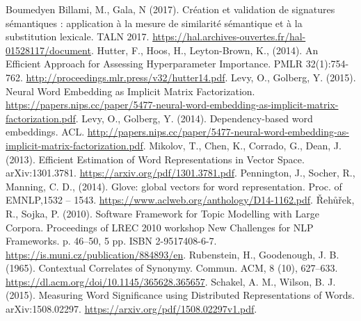 \documentclass[11pt,french,french]{article}
\begin{document}
\newpage

\nocite{*}

\begin{thebibliography}{999}
 Boumedyen Billami, M.,  Gala, N (2017). Création et validation de signatures sémantiques : application à la mesure de similarité sémantique et à la substitution lexicale. TALN 2017. \url{https://hal.archives-ouvertes.fr/hal-01528117/document}.
 Hutter, F., Hoos, H., Leyton-Brown, K., (2014). An Efficient Approach for Assessing Hyperparameter Importance. PMLR 32(1):754-762. \url{http://proceedings.mlr.press/v32/hutter14.pdf}.
 Levy, O., Golberg, Y. (2015). Neural Word Embedding as Implicit Matrix Factorization.
\url{https://papers.nips.cc/paper/5477-neural-word-embedding-as-implicit-matrix-factorization.pdf}.
 Levy, O., Golberg, Y. (2014). Dependency-based word embeddings. ACL. \url{http://papers.nips.cc/paper/5477-neural-word-embedding-as-implicit-matrix-factorization.pdf}.
 Mikolov, T.,  Chen, K., Corrado, G., Dean, J. (2013). Efficient Estimation of Word Representations in Vector Space. arXiv:1301.3781. \url{https://arxiv.org/pdf/1301.3781.pdf}.
 Pennington, J., Socher, R., Manning, C. D., (2014).  Glove: global vectors for word representation. Proc. of EMNLP,1532 – 1543. \url{https://www.aclweb.org/anthology/D14-1162.pdf}.
 {\v R}eh{\r u}{\v r}ek, R.,  Sojka, P. (2010). Software Framework for Topic Modelling with Large Corpora. Proceedings of LREC 2010 workshop New Challenges for NLP Frameworks. p. 46--50, 5 pp. ISBN 2-9517408-6-7. \url{https://is.muni.cz/publication/884893/en}.
 Rubenstein, H.,  Goodenough, J. B. (1965). Contextual Correlates of Synonymy. Commun. ACM, 8 (10), 627–633. \url{https://dl.acm.org/doi/10.1145/365628.365657}.
 Schakel, A. M., Wilson, B. J. (2015). Measuring Word Significance using Distributed Representations of Words. arXiv:1508.02297. \url{https://arxiv.org/pdf/1508.02297v1.pdf}.
\end{thebibliography}
\end{document}
